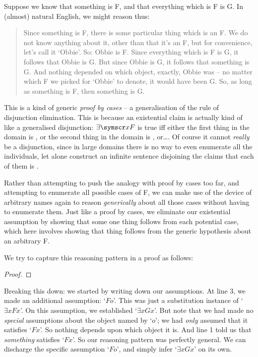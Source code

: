 Suppose we know that something is F, and that everything which is F is G. In (almost) natural English, we might reason thus:
	\begin{quote}
		Since something is F, there is some particular thing which is an F. We do not know anything about it, other than that it's an F, but for convenience, let's call it `Obbie'. So: Obbie is F. Since everything which is F is G, it follows that Obbie is G. But since Obbie is G, it follows that something is G. And nothing depended on which object, exactly, Obbie was – no matter which F we picked for `Obbie' to denote, it would have been G. So, as long as something is F, then something is G.
	\end{quote}
This is a kind of generic \emph{proof by cases} – a generalisation of the rule of disjunction elimination. This is because an existential claim is actually kind of like a generalised disjunction: $\exists \meta{xF}$ is true iff either the first thing in the domain is , or the second thing in the domain is , or…. Of course it cannot \emph{really} be a disjunction, since in large domains there is no way to even enumerate all the individuals, let alone construct an infinite sentence disjoining the claims that each of them is .

Rather than attempting to push the analogy with proof by cases too far, and attempting to enumerate all possible cases of F, we can make use of the device of arbitrary names again to reason \emph{generically} about all those cases without having to enumerate them. Just like a proof by cases, we eliminate our existential assumption by showing that some one thing follows from each potential case, which here involves showing that thing follows from the generic hypothesis about an arbitrary F. 

We try to capture this reasoning pattern in a proof as follows:
\begin{proof}
	\open{}
	\open
		 
	\close
\end{proof}\noindent
Breaking this down: we started by writing down our assumptions. At line 3, we made an additional assumption: `$Fo$'. This was just a substitution instance of `$\exists x Fx$'. On this assumption, we established `$\exists x Gx$'. But note that we had made no \emph{special} assumptions about the object named by `$o$'; we had \emph{only} assumed that it satisfies `$Fx$'. So nothing depends upon which object it is. And line 1 told us that \emph{something} satisfies `$Fx$'. So our reasoning pattern was perfectly general. We can discharge the specific assumption `$Fo$', and simply infer `$\exists x Gx$' on its own.


